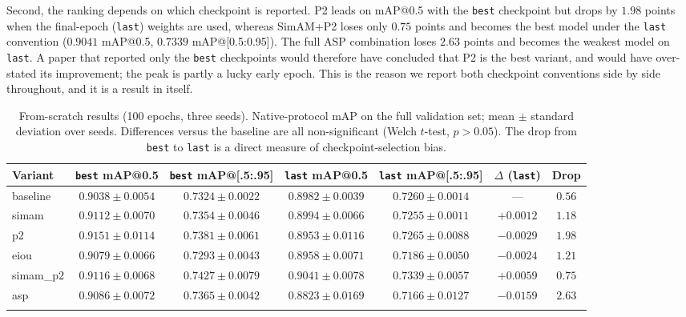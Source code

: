 \documentclass[pdflatex,sn-basic,Numbered]{sn-jnl}%
\begin{document}
Second, the ranking depends on which checkpoint is reported. P2 leads on mAP@0.5 with the \texttt{best} checkpoint but drops by $1.98$ points when the final-epoch (\texttt{last}) weights are used, whereas SimAM+P2 loses only $0.75$ points and becomes the best model under the \texttt{last} convention ($0.9041$ mAP@0.5, $0.7339$ mAP@[0.5:0.95]). The full ASP combination loses $2.63$ points and becomes the weakest model on \texttt{last}. A paper that reported only the \texttt{best} checkpoints would therefore have concluded that P2 is the best variant, and would have over-stated its improvement; the peak is partly a lucky early epoch. This is the reason we report both checkpoint conventions side by side throughout, and it is a result in itself.

\begin{table}[t]
\caption{From-scratch results (100 epochs, three seeds). Native-protocol mAP on the full validation set; mean $\pm$ standard deviation over seeds. Differences versus the baseline are all non-significant (Welch $t$-test, $p>0.05$). The drop from \texttt{best} to \texttt{last} is a direct measure of checkpoint-selection bias.}\label{tab:main}%
\centering
\begin{adjustbox}{max width=\textwidth}
\begin{tabular}{@{}lcccccc@{}}
\toprule
Variant & \texttt{best} mAP@0.5 & \texttt{best} mAP@[.5:.95] & \texttt{last} mAP@0.5 & \texttt{last} mAP@[.5:.95] & $\Delta$ (\texttt{last}) & Drop\\
\midrule
baseline   & $0.9038 \pm 0.0054$ & $0.7324 \pm 0.0022$ & $0.8982 \pm 0.0039$ & $0.7260 \pm 0.0014$ & --- & $0.56$\\
simam      & $0.9112 \pm 0.0070$ & $0.7354 \pm 0.0046$ & $0.8994 \pm 0.0066$ & $0.7255 \pm 0.0011$ & $+0.0012$ & $1.18$\\
p2         & $\mathbf{0.9151 \pm 0.0114}$ & $0.7381 \pm 0.0061$ & $0.8953 \pm 0.0116$ & $0.7265 \pm 0.0088$ & $-0.0029$ & $\mathbf{1.98}$\\
eiou       & $0.9079 \pm 0.0066$ & $0.7293 \pm 0.0043$ & $0.8958 \pm 0.0071$ & $0.7186 \pm 0.0050$ & $-0.0024$ & $1.21$\\
simam\_p2  & $0.9116 \pm 0.0068$ & $\mathbf{0.7427 \pm 0.0079}$ & $\mathbf{0.9041 \pm 0.0078}$ & $\mathbf{0.7339 \pm 0.0057}$ & $+0.0059$ & $0.75$\\
asp        & $0.9086 \pm 0.0072$ & $0.7365 \pm 0.0042$ & $0.8823 \pm 0.0169$ & $0.7166 \pm 0.0127$ & $-0.0159$ & $2.63$\\
\botrule
\end{tabular}
\end{adjustbox}
\end{table}
\end{document}
